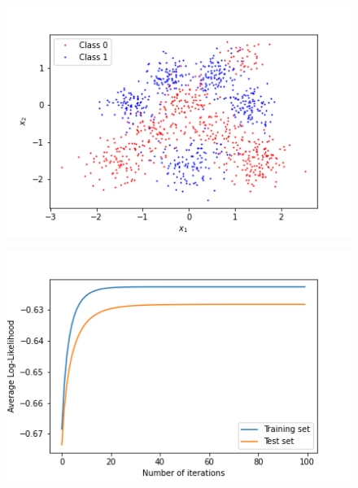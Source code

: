 \documentclass[a4paper]{article}
\begin{document}
    \begin{figure}
        \begin{minipage}{0.32\textwidth}
            \centering
            \includegraphics[width=\textwidth]{plots/ml_logistic_regression/data}
            \label{fig:data}
        \end{minipage}%
        \begin{minipage}{0.32\textwidth}
            \centering
            \includegraphics[width=\textwidth]{plots/ml_logistic_regression/log_likelihood}
            \label{fig:linear_log_likelihood}
        \end{minipage}%
        \begin{minipage}{0.32\textwidth}

\end{minipage}
\end{figure}
\end{document}
